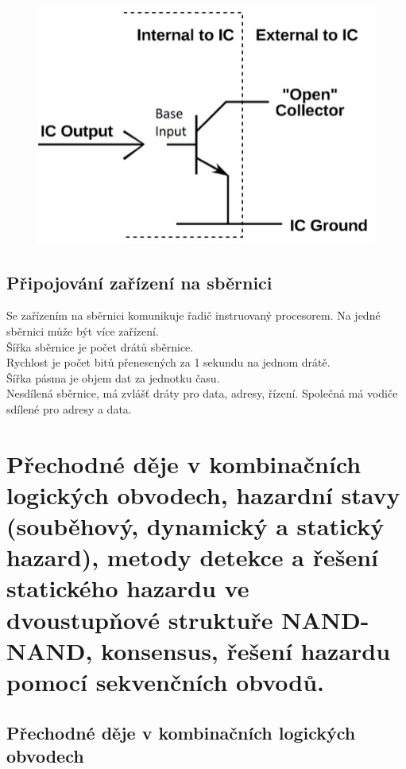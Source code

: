 \begin{figure}[h!]
    \centering
    \includegraphics[scale = 0.5]{img/OpenColl.png}
\end{figure}

\subsection{Připojování zařízení na sběrnici}
Se zařízením na sběrnici komunikuje řadič instruovaný procesorem. Na jedné sběrnici může být více zařízení.\\
Šířka sběrnice je počet drátů sběrnice.\\
Rychlost je počet bitů přenesených za 1 sekundu na jednom drátě.\\
Šířka pásma je objem dat za jednotku času.\\
Nesdílená sběrnice, má zvlášť dráty pro data, adresy, řízení. Společná má vodiče sdílené pro adresy a data.\\

\section{Přechodné děje v kombinačních logických obvodech, hazardní stavy (souběhový, dynamický a statický hazard), metody detekce a řešení statického hazardu ve dvoustupňové struktuře NAND-NAND, konsensus, řešení hazardu pomocí sekvenčních obvodů.}

\subsection{Přechodné děje v kombinačních logických obvodech}
